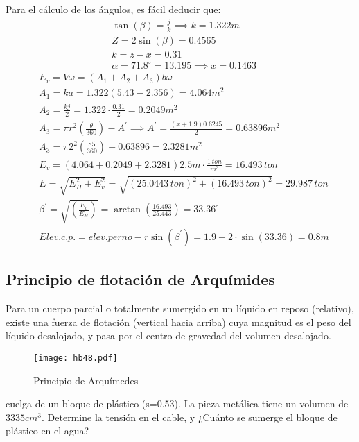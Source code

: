 Para el cálculo de los ángulos, es fácil deducir que: 
\begin{align*}
    &\tan{(\beta)}=\frac{j}{k}\implies k=1.322m\\ 
    &Z=2\sin{(\beta)}=0.4565\\
    &k=z-x=0.31\\
    &\alpha=71.8^{\circ}=13.195\implies x=0.1463
\end{align*}
\begin{align*}
    &E_v=V\omega=\left(A_1+A_2+A_3\right)b\omega\\
    &A_1=ka=1.322(5.43-2.356)=4.064m^2\\
    &A_2=\frac{kj}{2}=1.322\cdot \frac{0.31}{2}=0.2049m^2\\
    &A_3=\pi r^2\left(\frac{\theta}{360}\right)-A^{\prime}\implies A^{\prime}=\frac{(x+1.9)0.6245}{2}=0.63896m^2\\
    &A_3=\pi 2^2\left(\frac{85}{360}\right)-0.63896=2.3281m^2\\ 
    &E_v=\left(4.064+0.2049+2.3281\right)2.5m\cdot \frac{1\,ton}{m^3}=16.493\,ton\\
    &E=\sqrt{E_H^2+E_v^2}=\sqrt{(25.0443\,ton)^2+(16.493\,ton)^2}=29.987\,ton\\
    &\beta^{\prime}=\sqrt{\left(\frac{E_v}{E_H}\right)}=\arctan{\left(\frac{16.493}{25.443}\right)}=33.36^{\circ}\\
    &Elev.c.p. =elev.perno-r\sin{(\beta^{\prime})}=1.9-2\cdot \sin{(33.36)}=0.8m
\end{align*}

\subsection{Principio de flotación de Arquímides}

Para un cuerpo parcial o totalmente sumergido en un líquido en reposo (relativo), existe una fuerza de flotación (vertical hacia arriba) cuya magnitud es el peso del líquido desalojado, y pasa por el centro de gravedad del volumen desalojado.

\begin{figure}[h!]
    \centering
      \texttt{[image: hb48.pdf]}
      \caption{Principio de Arquímedes}
      \label{hb48}
\end{figure}

\begin{problem}[Una pieza de aluminio (s)=2.7]
    cuelga de un bloque de plástico (s=0.53). La pieza metálica tiene un volumen de $3335cm^3$. Determine la tensión en el cable, y ¿Cuánto se sumerge el bloque de plástico en el agua?
\end{problem}


